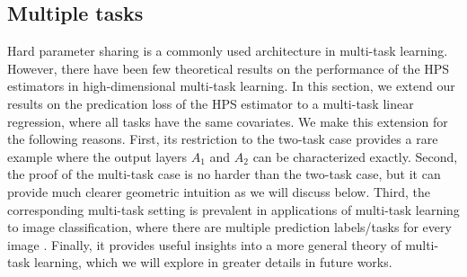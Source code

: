 \subsection{Multiple tasks}\label{sec_same}


Hard parameter sharing is a commonly used architecture in multi-task learning. However, there have been few theoretical results on the performance of the HPS estimators in high-dimensional multi-task learning. In this section, we extend our results on the predication loss of the HPS estimator to a multi-task linear regression, where all tasks have the same covariates. We make this extension for the following reasons. First, its restriction to the two-task case provides a rare example where the output layers $A_1$ and $A_2$ can be characterized exactly. Second, the proof of the multi-task case is no harder than the two-task case, but it can provide much clearer geometric intuition  as we will discuss below. Third, the corresponding multi-task setting is prevalent in applications of multi-task learning to image classification, where there are multiple prediction labels/tasks for every image \cite{chexnet17,EA20}. Finally, it provides useful insights into a more general theory of multi-task learning, which we will explore in greater details in future works.

